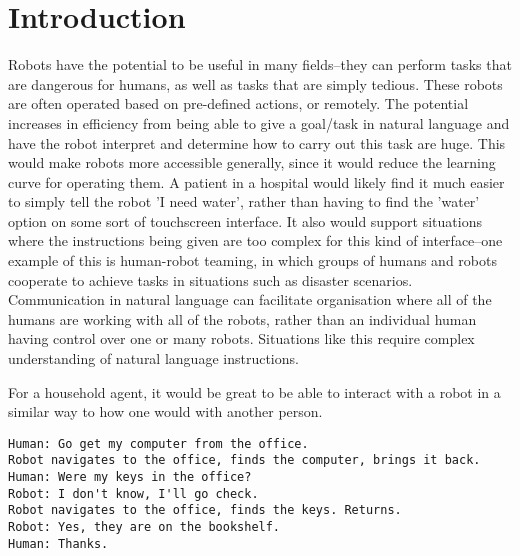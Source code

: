 \documentclass{article}
\begin{document}
\section{Introduction}
Robots have the potential to be useful in many fields–they can perform tasks
that are dangerous for humans, as well as tasks that are simply tedious. These
robots are often operated based on pre-defined actions, or remotely. The potential increases in efficiency from being able to give a goal/task in natural language and have the robot interpret and determine how to carry out this task are huge. %
This would make robots more accessible generally, since it would reduce the
learning curve for operating them. A patient in a hospital would likely find it much easier to simply tell the robot 'I need water', rather than having to find the 'water' option on some sort of touchscreen interface. It also would support situations where the instructions being given are too complex for this kind of interface--one example of this is human-robot teaming, in which groups of humans and robots cooperate to achieve tasks in situations such as disaster scenarios\cite{Kruijff-Korbayova:2015aa}. Communication in natural language can facilitate organisation where all of the humans are working with all of the robots, rather than an individual human having control over one or many robots. Situations like this require complex understanding of natural language instructions. 


For a household agent, it would be great to be able to interact with a robot in a similar way to how one would with another person. 
\begin{verbatim}
Human: Go get my computer from the office. 
Robot navigates to the office, finds the computer, brings it back. 
Human: Were my keys in the office?
Robot: I don't know, I'll go check. 
Robot navigates to the office, finds the keys. Returns.
Robot: Yes, they are on the bookshelf. 
Human: Thanks. 
\end{verbatim}
\end{document}
